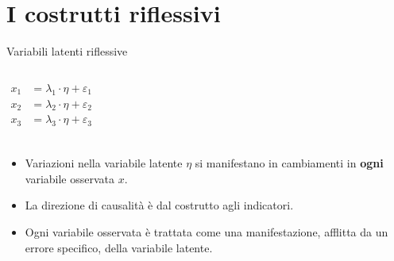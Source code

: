 \documentclass{beamer}
\begin{document}
\section{I costrutti riflessivi}
\begin{frame}{Variabili latenti riflessive}
    \begin{columns}
    \[
    \begin{aligned}
    x_1 &= \lambda_1 \cdot \eta + \varepsilon_1 \\
    x_2 &= \lambda_2 \cdot \eta + \varepsilon_2 \\
    x_3 &= \lambda_3 \cdot \eta + \varepsilon_3 \\
    \end{aligned}
    \]
    \end{columns}
    \vspace{1em}
    \pause
    \begin{itemize}
        \item Variazioni nella variabile latente $\eta$ si manifestano in cambiamenti in \textbf{ogni} variabile osservata $x$.
        \item La direzione di causalità è dal costrutto agli indicatori.
        \item Ogni variabile osservata è trattata come una manifestazione, afflitta da un errore specifico, della variabile latente.
    \end{itemize}
\end{frame}
\end{document}
